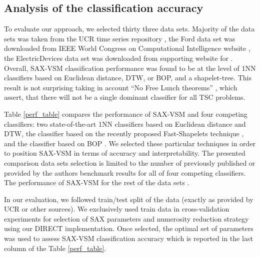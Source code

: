 \subsection{Analysis of the classification accuracy}
To evaluate our approach, we selected thirty three data sets. Majority of the data sets was taken 
from the UCR time series repository \cite{citeulike:12563599}, the Ford data set was downloaded from 
IEEE World Congress on Computational Intelligence website \cite{citeulike:12563754}, the 
ElectricDevices data set was downloaded from supporting website for \cite{citeulike:11345338}. 
Overall, SAX-VSM classification performance was found to be at the level of 
1NN classifiers based on Euclidean distance, DTW, or BOP, and a shapelet-tree. 
This result is not surprising taking in account ``No Free Lunch theorems'' \cite{citeulike:404286}, 
which assert, that there will not be a single dominant classifier for all TSC problems.

Table \ref{perf_table} compares the performance of SAX-VSM and four competing 
classifiers: two state-of-the-art 1NN classifiers based on Euclidean distance and DTW, 
the classifier based on the recently proposed Fast-Shapelets technique \cite{citeulike:12563493},
and the classifier based on BOP \cite{citeulike:10525778}. 
We selected these particular techniques in order to position SAX-VSM 
in terms of accuracy and interpretability. 
The presented comparison data sets selection is limited to the number 
of previously published or provided by the authors benchmark results for all of 
four competing classifiers. 
The performance of SAX-VSM for the rest of the data sets \cite{citeulike:12563560}.

In our evaluation, we followed train/test split of the data (exactly as provided by UCR or other
sources). We exclusively used train data in cross-validation experiments for selection of SAX
parameters and numerosity reduction strategy using our DIRECT implementation. 
Once selected, the optimal set of parameters was used to assess SAX-VSM classification 
accuracy which is reported in the last column of the Table \ref{perf_table}.

